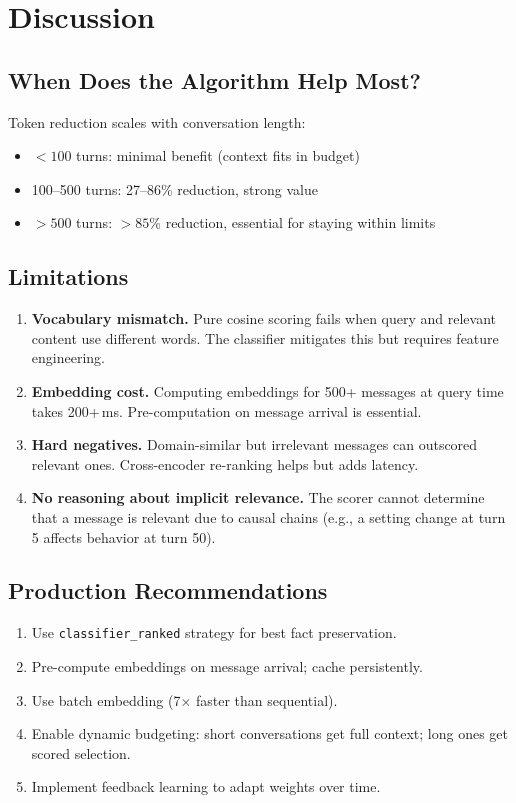 \documentclass[11pt,a4paper]{article}
\begin{document}
\section{Discussion}
\label{sec:discussion}

\subsection{When Does the Algorithm Help Most?}

Token reduction scales with conversation length:
\begin{itemize}
    \item $<100$ turns: minimal benefit (context fits in budget)
    \item 100--500 turns: 27--86\% reduction, strong value
    \item $>500$ turns: $>85$\% reduction, essential for staying within limits
\end{itemize}

\subsection{Limitations}

\begin{enumerate}
    \item \textbf{Vocabulary mismatch.} Pure cosine scoring fails when query and
    relevant content use different words. The classifier mitigates this but requires
    feature engineering.
    \item \textbf{Embedding cost.} Computing embeddings for 500+ messages at query
    time takes 200+\,ms. Pre-computation on message arrival is essential.
    \item \textbf{Hard negatives.} Domain-similar but irrelevant messages can
    outscored relevant ones. Cross-encoder re-ranking helps but adds latency.
    \item \textbf{No reasoning about implicit relevance.} The scorer cannot
    determine that a message is relevant due to causal chains (e.g., a setting
    change at turn 5 affects behavior at turn 50).
\end{enumerate}

\subsection{Production Recommendations}

\begin{enumerate}
    \item Use \texttt{classifier\_ranked} strategy for best fact preservation.
    \item Pre-compute embeddings on message arrival; cache persistently.
    \item Use batch embedding (7$\times$ faster than sequential).
    \item Enable dynamic budgeting: short conversations get full context;
    long ones get scored selection.
    \item Implement feedback learning to adapt weights over time.
\end{enumerate}
\end{document}
